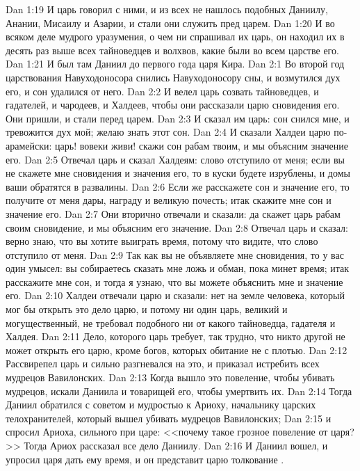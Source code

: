 \vs Dan 1:19 И царь говорил с ними, и из всех  не нашлось подобных Даниилу, Анании, Мисаилу и Азарии, и стали они служить пред царем.
\vs Dan 1:20 И во всяком деле мудрого уразумения, о чем ни спрашивал их царь, он находил их в десять раз выше всех тайноведцев и волхвов, какие были во всем царстве его.
\vs Dan 1:21 И был там Даниил до первого года царя Кира.
\vs Dan 2:1 Во второй год царствования Навуходоносора снились Навуходоносору сны, и возмутился дух его, и сон удалился от него.
\vs Dan 2:2 И велел царь созвать тайноведцев, и гадателей, и чародеев, и Халдеев, чтобы они рассказали царю сновидения его. Они пришли, и стали перед царем.
\vs Dan 2:3 И сказал им царь: сон снился мне, и тревожится дух мой; желаю знать этот сон.
\vs Dan 2:4 И сказали Халдеи царю по-арамейски: царь! вовеки живи! скажи сон рабам твоим, и мы объясним значение его.
\vs Dan 2:5 Отвечал царь и сказал Халдеям: слово отступило от меня; если вы не скажете мне сновидения и значения его, то в куски будете изрублены, и домы ваши обратятся в развалины.
\vs Dan 2:6 Если же расскажете сон и значение его, то получите от меня дары, награду и великую почесть; итак скажите мне сон и значение его.
\vs Dan 2:7 Они вторично отвечали и сказали: да скажет царь рабам своим сновидение, и мы объясним его значение.
\vs Dan 2:8 Отвечал царь и сказал: верно знаю, что вы хотите выиграть время, потому что видите, что слово отступило от меня.
\vs Dan 2:9 Так как вы не объявляете мне сновидения, то у вас один умысел: вы собираетесь сказать мне ложь и обман, пока минет время; итак расскажите мне сон, и тогда я узнаю, что вы можете объяснить мне и значение его.
\vs Dan 2:10 Халдеи отвечали царю и сказали: нет на земле человека, который мог бы открыть это дело царю, и потому ни один царь, великий и могущественный, не требовал подобного ни от какого тайноведца, гадателя и Халдея.
\vs Dan 2:11 Дело, которого царь требует, так трудно, что никто другой не может открыть его царю, кроме богов, которых обитание не с плотью.
\vs Dan 2:12 Рассвирепел царь и сильно разгневался на это, и приказал истребить всех мудрецов Вавилонских.
\rsbpar\vs Dan 2:13 Когда вышло это повеление, чтобы убивать мудрецов, искали Даниила и товарищей его, чтобы умертвить их.
\vs Dan 2:14 Тогда Даниил обратился с советом и мудростью к Ариоху, начальнику царских телохранителей, который вышел убивать мудрецов Вавилонских;
\vs Dan 2:15 и спросил Ариоха, сильного при царе: <<почему такое грозное повеление от царя?>> Тогда Ариох рассказал все дело Даниилу.
\vs Dan 2:16 И Даниил вошел, и упросил царя дать ему время, и он представит царю толкование .
